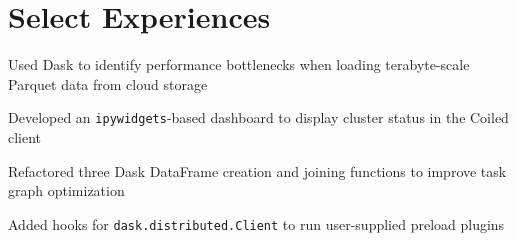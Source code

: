 %
%

%
%

%
%


\section{Select Experiences}

\begin{tightemize}
\item Used Dask to identify performance bottlenecks when loading terabyte-scale Parquet data from cloud storage
\item Developed an \verb|ipywidgets|-based dashboard to display cluster status in the Coiled client
\item Refactored three Dask DataFrame creation and joining functions to improve task graph optimization
\item Added hooks for \verb|dask.distributed.Client| to run user-supplied preload plugins
\end{tightemize}

\sectionsep

\\
\\

